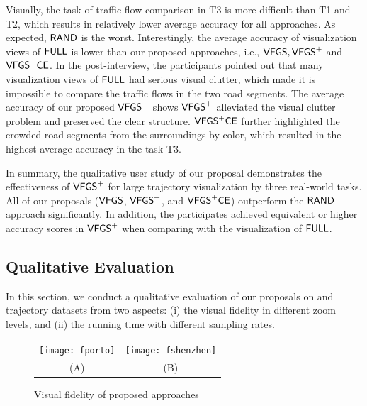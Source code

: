 

Visually, the task of traffic flow comparison in T3 is more difficult than T1 and T2, which results in relatively lower average accuracy for all approaches.  As expected, $\mathsf{RAND}$ is the worst.
Interestingly, the average accuracy of visualization views of $\mathsf{FULL}$ is lower than our proposed approaches, i.e., $\mathsf{VFGS},\mathsf{VFGS}^{+}$ and $\mathsf{VFGS}^{+}\mathsf{CE}$.
In the post-interview, the participants pointed out that many visualization views of $\mathsf{FULL}$ had serious visual clutter,
which made it is impossible to compare the traffic flows in the two road segments.
The average accuracy of our proposed $\mathsf{VFGS}^{+}$ shows $\mathsf{VFGS}^{+}$ alleviated the visual clutter problem and preserved the clear structure.
$\mathsf{VFGS}^{+}\mathsf{CE}$ further highlighted the crowded road segments from the surroundings by color, which {resulted in} the highest average accuracy in the task T3.

In summary, the qualitative user study of our proposal demonstrates the effectiveness of $\mathsf{VFGS}^{+}$ for large trajectory visualization by three real-world tasks.
All of our proposals ($\mathsf{VFGS}$, $\mathsf{VFGS}^{+}$, and $\mathsf{VFGS}^{+}\mathsf{CE}$) outperform the $\mathsf{RAND}$ approach significantly.
In addition, the participates achieved equivalent or higher accuracy scores in $\mathsf{VFGS}^{+}$ when comparing with the visualization of $\mathsf{FULL}$.

\vspace{-2mm}
\subsection{Qualitative Evaluation}\label{sec:quality}
In this section, we conduct a qualitative evaluation of our proposals on \pt{} and \sz{} trajectory datasets from two aspects: (i) the visual fidelity in different zoom levels,
and (ii) the running time with different sampling rates.

\begin{figure}
 \centering
 \small
 \begin{tabular}{cc}
   \texttt{[image: fporto]}
   &
   \texttt{[image: fshenzhen]}
   \\
   (A) \pt{}
   &
   (B) \sz{}
 \end{tabular}
 \vspace{-3mm}
 \caption{Visual fidelity of proposed approaches}
 \label{fig:fidelity}
 \vspace{-4mm}
\end{figure}

